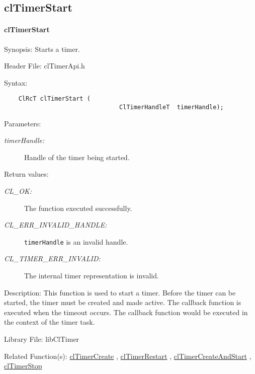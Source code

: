 \begin{flushleft}
\subsection{clTimerStart}
\hypertarget{pagetmr106}{}\paragraph{cl\-Timer\-Start}\label{pagetmr106}
\begin{Desc}
\item[Synopsis:]Starts a timer.\end{Desc}
\begin{Desc}
\item[Header File:]clTimerApi.h\end{Desc}
\begin{Desc}
\item[Syntax:]

\footnotesize\begin{verbatim}    ClRcT clTimerStart (
                         		ClTimerHandleT  timerHandle);
\end{verbatim}
\normalsize
\end{Desc}
\begin{Desc}
\item[Parameters:]
\begin{description}
\item[{\em timer\-Handle:}]Handle of the timer being started.\end{description}
\end{Desc}
\begin{Desc}
\item[Return values:]
\begin{description}
\item[{\em CL\_\-OK:}]The function executed successfully. 
\item[{\em CL\_\-ERR\_\-INVALID\_\-HANDLE:}]{\tt{timerHandle}} is an invalid handle. 
\item[{\em CL\_\-TIMER\_\-ERR\_\-INVALID:}]The internal timer representation is invalid.\end{description}
\end{Desc}
\begin{Desc}
\item[Description:]This function is used to start a timer. Before the timer can be started, the timer must be created and made active. The callback 
function is executed when the timeout occurs. The callback function would be executed in the context of the timer task.\end{Desc}
\begin{Desc}
\item[Library File:]lib\-Cl\-Timer\end{Desc}
\begin{Desc}
\item[Related Function(s):]\hyperlink{pagetmr104}{cl\-Timer\-Create} , \hyperlink{pagetmr109}{cl\-Timer\-Restart} , 
\hyperlink{pagetmr108}{cl\-Timer\-Create\-And\-Start} , \hyperlink{pagetmr107}{cl\-Timer\-Stop} \end{Desc}



\end{flushleft}
